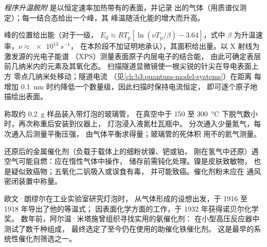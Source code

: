 \begin{definition}[程序升温脱附]\label{def:b3:surfaces-catalysis:tpd}
\emph{程序升温脱附}
是以恒定速率加热带有的表面，并记录
出的气体（用质谱仪测定）；每一结合态给出一个峰，其
峰温随活化能的增大而升高。
\end{definition}

峰的位置给出能（对于一级，
$E_d \approx RT_{\mathrm p}[\ln(\nu T_{\mathrm p}/\beta) - 3.64]$，式中 $\beta$ 为升温速率，$\nu \approx \qty{e13}{s^{-1}}$，
在本阶段不加证明地承认），其面积给出量。以 X 射线为激发源的光电子能谱
（XPS）测量表面原子内层电子的结合能，
由此可确定表层前几纳米内的元素及其氧化态。
扫描隧道显微镜使一根尖锐的针尖在导电表面上方
零点几纳米处移动；隧道电流
（见\cref{ch:b3:quantum-model-systems}）在距离
每增加 \qty{0.1}{nm} 时约降低一个数量级，因此扫描时保持电流恒定，
即可逐个原子地描绘出表面。

\begin{inthelab}[BET 测量]
称取约 \qty{0.2}{g} 样品装入带灯泡的玻璃管，
在真空中于 150 至 \qty{300}{\celsius} 下脱气数小时，再次称重后安装到仪器上，
灯泡浸入液氮杜瓦瓶中。
分次通入少量氮气，每次通入后测量平衡压强，
由气体平衡求得量；玻璃管的死体积
用不的氦气测量。
\end{inthelab}

\begin{safety}{}
还原后的金属催化剂（负载于载体上的细粉状镍、钯或铂，
刚在氢气中还原）遇空气可能自燃：应在惰性气体中操作，
储存前需钝化处理。镍是皮肤致敏物，
也是疑似致癌物；五氧化二钒吸入或误食有毒，
并可能致癌。催化剂粉末应在
通风密闭装置中称量。
\end{safety}

\begin{history}[朗缪尔与氨催化剂]
欧文·朗缪尔在工业实验室研究灯泡时，
从气体形成的设想出发，于 1916 至 1918 年导出了他的等温式；
因表面化学方面的工作，于 1932 年获得诺贝尔化学奖。
数年前，阿尔温·米塔施曾组织寻找实用的氨催化剂：
在小型高压反应器中测试了数千种组成，
最终选定了至今仍在使用的助催化铁催化剂。
这是最早的系统性催化剂筛选之一。
\end{history}

